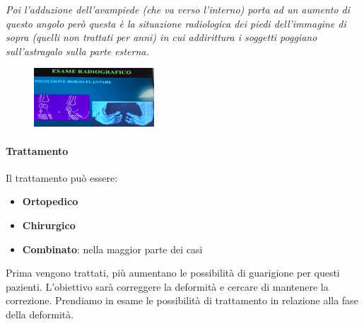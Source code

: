 \emph{Poi l'adduzione dell'avampiede (che va verso l'interno) porta ad un aumento di questo angolo però questa è la situazione radiologica dei piedi dell'immagine di sopra (quelli non trattati per anni) in cui addirittura i soggetti poggiano sull'astragalo sulla parte esterna.}

\begin{figure}[!ht]
\centering
\includegraphics[width=0.4\textwidth]{016/image14.png}
\end{figure}

\paragraph{Trattamento}

Il trattamento può essere:

\begin{itemize}
\item
  \textbf{Ortopedico}
\item
  \textbf{Chirurgico}
\item
  \textbf{Combinato}: nella maggior parte dei casi
\end{itemize}

Prima vengono trattati, più aumentano le possibilità di guarigione per questi pazienti. L'obiettivo sarà correggere la deformità e cercare di mantenere la correzione. Prendiamo in esame le possibilità di
trattamento in relazione alla fase della deformità.

